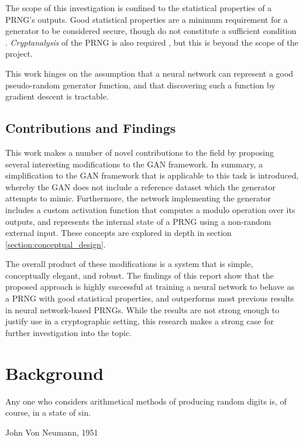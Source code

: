 \documentclass[12pt, titlepage]{report}
\theoremstyle{definition}
\begin{document}
The scope of this investigation is confined to the statistical properties of a PRNG's outputs. Good statistical properties are a minimum requirement for a generator to be considered secure, though do not constitute a sufficient condition \cite[p. 170]{menezes1996handbook}. \emph{Cryptanalysis} of the PRNG is also required \cite[Abstract]{rukhin2001statistical}\cite[p. 3-6]{kelsey1998cryptanalytic}, but this is beyond the scope of the project.

This work hinges on the assumption that a neural network can represent a good pseudo-random generator function, and that discovering such a function by gradient descent is tractable.


\section{Contributions and Findings}
This work makes a number of novel contributions to the field by proposing several interesting modifications to the GAN framework. In summary, a simplification to the GAN framework that is applicable to this task is introduced, whereby the GAN does not include a reference dataset which the generator attempts to mimic. Furthermore, the network implementing the generator includes a custom activation function that computes a modulo operation over its outputs, and represents the internal state of a PRNG using a non-random external input. These concepts are explored in depth in section \ref{section:conceptual_design}. 

The overall product of these modifications is a system that is simple, conceptually elegant, and robust. The findings of this report show that the proposed approach is highly successful at training a neural network to behave as a PRNG with good statistical properties, and outperforms most previous results in neural network-based PRNGs. While the results are not strong enough to justify use in a cryptographic setting, this research makes a strong case for further investigation into the topic.


\chapter{Background}\label{chapter:background}
\epigraph{Any one who considers arithmetical methods of producing random digits is, of course, in a state of sin.}{John Von Neumann, 1951}
\end{document}
